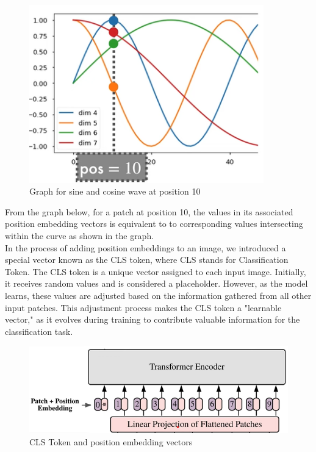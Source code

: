 \begin{figure}[htbp]
    \centering
    \includegraphics[width=4in]{img/pos 10.png}
    \caption{{Graph for sine and cosine wave  at position 10}}
\end{figure}
From the graph below, for a patch at position 10, the values in its associated position embedding vectors is equivalent to to corresponding values intersecting within the curve as shown in the graph.\\
\newpage
In the process of adding position embeddings to an image, we introduced a special vector known as the CLS token, where CLS stands for Classification Token. The CLS token is a unique vector assigned to each input image. Initially, it receives random values and is considered a placeholder. However, as the model learns, these values are adjusted based on the information gathered from all other input patches. This adjustment process makes the CLS token a "learnable vector," as it evolves during training to contribute valuable information for the classification task.\\

\begin{figure}[htbp]
    \centering
    \includegraphics[width=5in]{img/CLS token.png}
    \caption{{CLS Token and position embedding vectors}}
\end{figure}

